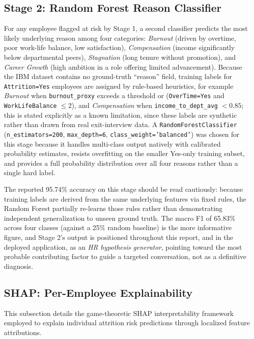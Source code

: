\documentclass[11pt,a4paper]{article}
\newcommand{\code}[1]{\texttt{\footnotesize #1}}
\begin{document}
\subsection{Stage 2: Random Forest Reason Classifier}

For any employee flagged at risk by Stage 1, a second classifier predicts the most likely underlying reason among four categories: \emph{Burnout} (driven by overtime, poor work-life balance, low satisfaction), \emph{Compensation} (income significantly below departmental peers), \emph{Stagnation} (long tenure without promotion), and \emph{Career Growth} (high ambition in a role offering limited advancement). Because the IBM dataset contains no ground-truth ``reason'' field, training labels for \code{Attrition=Yes} employees are assigned by rule-based heuristics, for example \emph{Burnout} when \code{burnout\_proxy} exceeds a threshold or (\code{OverTime=Yes} and \code{WorkLifeBalance} $\leq 2$), and \emph{Compensation} when \code{income\_to\_dept\_avg} $< 0.85$; this is stated explicitly as a known limitation, since these labels are synthetic rather than drawn from real exit-interview data. A \code{RandomForestClassifier} (\code{n\_estimators=200}, \code{max\_depth=6}, \code{class\_weight='balanced'}) was chosen for this stage because it handles multi-class output natively with calibrated probability estimates, resists overfitting on the smaller Yes-only training subset, and provides a full probability distribution over all four reasons rather than a single hard label.

The reported 95.74\% accuracy on this stage should be read cautiously: because training labels are derived from the same underlying features via fixed rules, the Random Forest partially re-learns those rules rather than demonstrating independent generalization to unseen ground truth. The macro F1 of 65.83\% across four classes (against a 25\% random baseline) is the more informative figure, and Stage 2's output is positioned throughout this report, and in the deployed application, as an \emph{HR hypothesis generator}, pointing toward the most probable contributing factor to guide a targeted conversation, not as a definitive diagnosis.

\subsection{SHAP: Per-Employee Explainability}
\label{sec:mod3-shap}

This subsection details the game-theoretic SHAP interpretability framework employed to explain individual attrition risk predictions through localized feature attributions.
\end{document}
